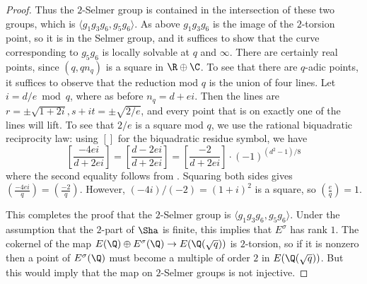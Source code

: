 \documentclass[12pt]{amsart}
\newcommand{\adam}[1]{{\textbf{Adam}: {\textcolor{blue}{#1}}}}
\begin{document}
\begin{proof}
Thus the $2$-Selmer group is contained in the intersection of these two groups, which is
$\langle g_1g_3g_6,g_5g_6 \rangle$.  As above $g_1g_3g_6$ is the image of the $2$-torsion point,
so it is in the Selmer group, and it suffices to show that the curve corresponding to $g_5g_6$
is locally solvable at $q$ and $\infty$.  There are certainly real points, since
$(q,qn_q)$ is a square in $\R \oplus \C$.  To see that there are $q$-adic points,
it suffices to observe that the reduction mod $q$ is the union of four lines.  Let
$i = d/e \bmod q$, where as before $n_q = d+ei$.  Then the lines are
$r = \pm \sqrt{1+2i}, s + it = \pm \sqrt{2/e}$,
and every point that is on exactly one of the lines will lift.  To see that $2/e$ is a
square mod $q$, we use the rational biquadratic reciprocity law: using $[]$ for the
biquadratic residue symbol, we have
$$\left[\frac{-4ei}{d+2ei}\right] = \left[\frac{d-2ei}{d+2ei}\right] = \left[\frac{-2}{d+2ei}\right]\cdot (-1)^{(d^2-1)/8}$$
where the second equality follows from \cite[Exercises 9.27--30]{ireland-rosen}.
Squaring both sides gives $\left(\frac{-4ei}{q}\right) = \left(\frac{-2}{q}\right)$.  However,
$(-4i)/(-2) = (1+i)^2$ is a square, so $\left(\frac eq\right)=1$.

This completes the proof that the $2$-Selmer group is $\langle g_1g_3g_6,g_5g_6 \rangle$.
Under the assumption that the $2$-part of $\Sha$ is finite, this implies that $E^\sigma$ has
rank $1$.  The cokernel of the map $E(\Q) \oplus E^\sigma(\Q) \to E(\Q(\sqrt{q}))$ is
$2$-torsion, so if it is nonzero then a point of $E^\sigma(\Q)$ must become a multiple of
order $2$ in $E(\Q(\sqrt{q}))$.  But this would imply that the map on $2$-Selmer groups is
not injective.


\end{proof}
\end{document}

